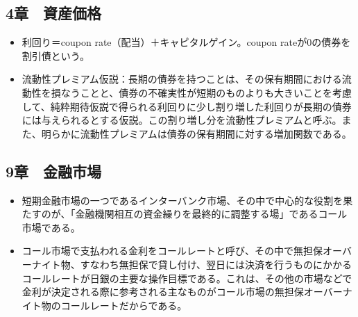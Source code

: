 \documentclass{jsarticle}
\begin{document}
\subsection{4章　資産価格}
\begin{itemize}
	\item 利回り＝coupon rate（配当）＋キャピタルゲイン。coupon rateが0の債券を割引債という。
	\item 流動性プレミアム仮説：長期の債券を持つことは、その保有期間における流動性を損なうことと、債券の不確実性が短期のものよりも大きいことを考慮して、純粋期待仮説で得られる利回りに少し割り増した利回りが長期の債券には与えられるとする仮説。この割り増し分を流動性プレミアムと呼ぶ。また、明らかに流動性プレミアムは債券の保有期間に対する増加関数である。
\end{itemize}

\subsection{9章　金融市場}
\begin{itemize}
	\item 短期金融市場の一つであるインターバンク市場、その中で中心的な役割を果たすのが、「金融機関相互の資金繰りを最終的に調整する場」であるコール市場である。
	\item コール市場で支払われる金利をコールレートと呼び、その中で無担保オーバーナイト物、すなわち無担保で貸し付け、翌日には決済を行うものにかかるコールレートが日銀の主要な操作目標である。これは、その他の市場などで金利が決定される際に参考される主なものがコール市場の無担保オーバーナイト物のコールレートだからである。
\end{itemize}
\end{document}
